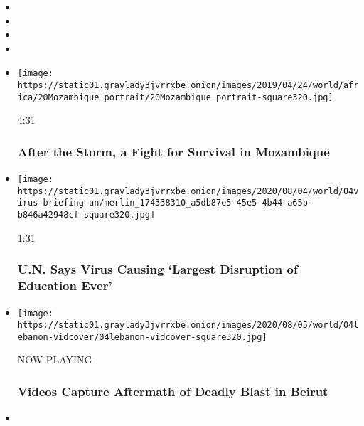 \begin{itemize}
\item
\item
\item
\item
\end{itemize}

\begin{itemize}
\item
  \href{https://www.nytimes3xbfgragh.onion/video/world/africa/100000006439514/mozambique-flood-cyclone-idai.html?action=click\&module=video-series-bar\&region=header\&pgtype=Article\&playlistId=video/world}{}

  \texttt{[image: https://static01.graylady3jvrrxbe.onion/images/2019/04/24/world/africa/20Mozambique\_portrait/20Mozambique\_portrait-square320.jpg]}

  4:31

  \hypertarget{after-the-storm-a-fight-for-survival-in-mozambique}{%
  \subsubsection{After the Storm, a Fight for Survival in
  Mozambique}\label{after-the-storm-a-fight-for-survival-in-mozambique}}
\item
  \href{https://www.nytimes3xbfgragh.onion/video/us/100000007272762/un-secretary-generational-catastrophe-schools-reopen.html?action=click\&module=video-series-bar\&region=header\&pgtype=Article\&playlistId=video/world}{}

  \texttt{[image: https://static01.graylady3jvrrxbe.onion/images/2020/08/04/world/04virus-briefing-un/merlin\_174338310\_a5db87e5-45e5-4b44-a65b-b846a42948cf-square320.jpg]}

  1:31

  \hypertarget{un-says-virus-causing-largest-disruption-of-education-ever}{%
  \subsubsection{U.N. Says Virus Causing `Largest Disruption of
  Education
  Ever'}\label{un-says-virus-causing-largest-disruption-of-education-ever}}
\item
  \texttt{[image: https://static01.graylady3jvrrxbe.onion/images/2020/08/05/world/04lebanon-vidcover/04lebanon-vidcover-square320.jpg]}

  NOW PLAYING

  \hypertarget{videos-capture-aftermath-of-deadly-blast-in-beirut-2}{%
  \subsubsection{Videos Capture Aftermath of Deadly Blast in
  Beirut}\label{videos-capture-aftermath-of-deadly-blast-in-beirut-2}}
\item
  \href{https://www.nytimes3xbfgragh.onion/video/world/100000007271927/pacific-island-rescue-video.html?action=click\&module=video-series-bar\&region=header\&pgtype=Article\&playlistId=video/world}{}


\end{itemize}
